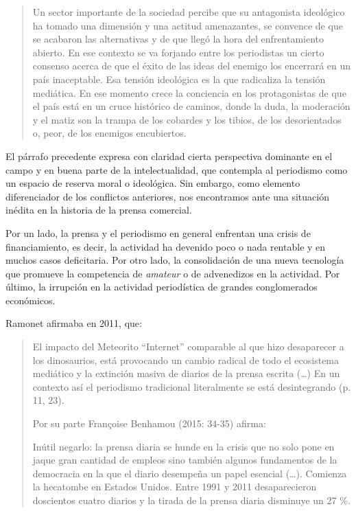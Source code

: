 \begin{quote}
Un sector importante de la sociedad percibe que su antagonista ideológico ha tomado una dimensión y una actitud amenazantes, se convence de que se acabaron las alternativas y de que llegó la hora del enfrentamiento abierto. En ese contexto se va forjando entre los periodistas un cierto consenso acerca de que el éxito de las ideas del enemigo los encerrará en un país inaceptable. Esa tensión ideológica es la que radicaliza la tensión mediática. En ese momento crece la conciencia en los protagonistas de que el país está en un cruce histórico de caminos, donde la duda, la moderación y el matiz son la trampa de los cobardes y los tibios, de los desorientados o, peor, de los enemigos encubiertos.
\end{quote}

El párrafo precedente expresa con claridad cierta perspectiva dominante en el campo y en buena parte de la intelectualidad, que contempla al periodismo como un espacio de reserva moral o ideológica. Sin embargo, como elemento diferenciador de los conflictos anteriores, nos encontramos ante una situación inédita en la historia de la prensa comercial.

Por un lado, la prensa y el periodismo en general enfrentan una crisis de financiamiento, es decir, la actividad ha devenido poco o nada rentable y en muchos casos deficitaria. Por otro lado, la consolidación de una nueva tecnología que promueve la competencia de \emph{amateur} o de advenedizos en la actividad. Por último, la irrupción en la actividad periodística de grandes conglomerados económicos.

Ramonet afirmaba en 2011, que:

\begin{quote}
El impacto del Meteorito \enquote{Internet} comparable al que hizo desaparecer a los dinosaurios, está provocando un cambio radical de todo el ecosistema mediático y la extinción masiva de diarios de la prensa escrita (\ldots) En un contexto así el periodismo tradicional literalmente se está desintegrando (p. 11, 23).

Por su parte Françoise Benhamou (2015: 34-35) afirma:

Inútil negarlo: la prensa diaria se hunde en la crisis que no solo pone en jaque gran cantidad de empleos sino también algunos fundamentos de la democracia en la que el diario desempeña un papel esencial (\ldots). Comienza la hecatombe en Estados Unidos. Entre 1991 y 2011 desaparecieron doscientos cuatro diarios y la tirada de la prensa diaria disminuye un 27 \%.
\end{quote}

